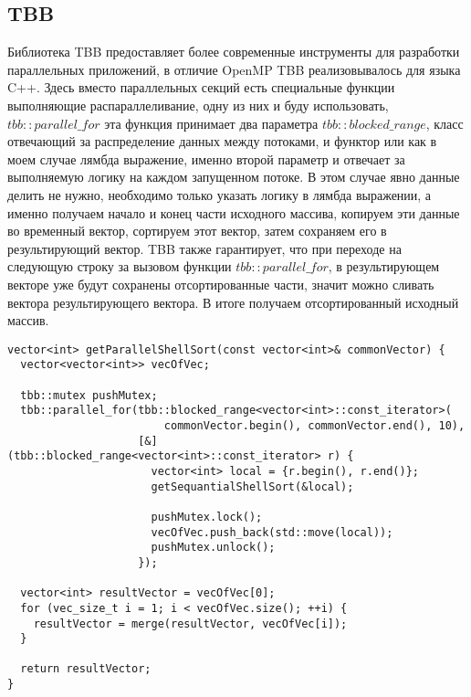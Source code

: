 \documentclass{report}
\begin{document}
\subsection*{TBB}
\par Библиотека TBB предоставляет более современные инструменты для разработки параллельных приложений, в отличие OpenMP TBB реализовывалось для языка C++. Здесь вместо параллельных секций есть специальные функции выполняющие распараллеливание, одну из них и буду использовать, $tbb::parallel\_for$ эта функция принимает два параметра $tbb::blocked\_range$, класс отвечающий за распределение данных между потоками, и функтор или как в моем случае лямбда выражение, именно второй параметр и отвечает за выполняемую логику на каждом запущенном потоке. В этом случае явно данные делить не нужно, необходимо только указать логику в лямбда выражении, а именно получаем начало и конец части исходного массива, копируем эти данные во временный вектор, сортируем этот вектор, затем сохраняем его в результирующий вектор. TBB также гарантирует, что при переходе на следующую строку за вызовом функции $tbb::parallel\_for$, в результирующем векторе уже будут сохранены отсортированные части, значит можно сливать вектора результирующего вектора. В итоге получаем отсортированный исходный массив.

\begin{lstlisting}
vector<int> getParallelShellSort(const vector<int>& commonVector) {
  vector<vector<int>> vecOfVec;

  tbb::mutex pushMutex;
  tbb::parallel_for(tbb::blocked_range<vector<int>::const_iterator>(
                        commonVector.begin(), commonVector.end(), 10),
                    [&](tbb::blocked_range<vector<int>::const_iterator> r) {
                      vector<int> local = {r.begin(), r.end()};
                      getSequantialShellSort(&local);

                      pushMutex.lock();
                      vecOfVec.push_back(std::move(local));
                      pushMutex.unlock();
                    });

  vector<int> resultVector = vecOfVec[0];
  for (vec_size_t i = 1; i < vecOfVec.size(); ++i) {
    resultVector = merge(resultVector, vecOfVec[i]);
  }

  return resultVector;
}
\end{lstlisting}

\newpage
\end{document}
